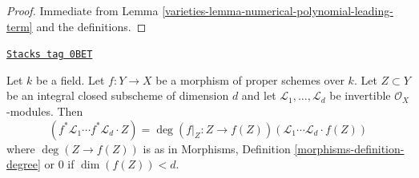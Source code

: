 \begin{proof}

Immediate from Lemma \ref{varieties-lemma-numerical-polynomial-leading-term}
and the definitions.
\end{proof}

\begin{lemma}
\label{varieties-lemma-intersection-number-and-pullback}
\href{https://stacks.math.columbia.edu/tag/0BET}{\texttt{Stacks tag 0BET}}

Let $k$ be a field. Let $f : Y \to X$ be a morphism of proper schemes over $k$.
Let $Z \subset Y$ be an integral closed subscheme of dimension $d$ and let
$\mathcal{L}_1, \ldots, \mathcal{L}_d$ be invertible $\mathcal{O}_X$-modules.
Then
$$
(f^*\mathcal{L}_1 \cdots f^*\mathcal{L}_d \cdot Z) =
\deg(f|_Z : Z \to f(Z)) (\mathcal{L}_1 \cdots \mathcal{L}_d \cdot f(Z))
$$
where $\deg(Z \to f(Z))$ is as in
Morphisms, Definition \ref{morphisms-definition-degree}
or $0$ if $\dim(f(Z)) < d$.
\end{lemma}


